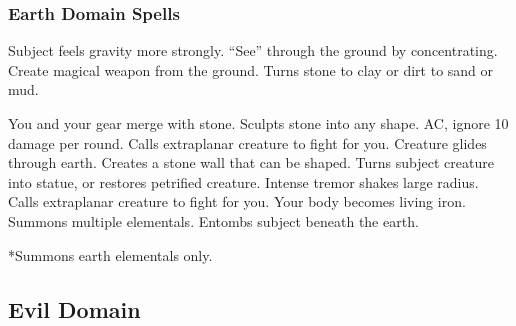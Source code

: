 \subsubsection{Earth Domain Spells}
\begin{spelllist}
   Subject feels gravity more strongly.
   ``See'' through the ground by concentrating.
   Create magical weapon from the ground.
   Turns stone to clay or dirt to sand or mud.
  
   You and your gear merge with stone.
   Sculpts stone into any shape.
    AC, ignore 10 damage per round.
   Calls extraplanar creature to fight for you.
   Creature glides through earth. 
   Creates a stone wall that can be shaped.
  \spellhead[6]{}
   Turns subject creature into statue, or restores petrified creature.
   Intense tremor shakes large radius.
   Calls extraplanar creature to fight for you.
   Your body becomes living iron.
  \spellhead[8]{}
   Summons multiple elementals.
   Entombs subject beneath the earth.
\end{spelllist}
*Summons earth elementals only.

\subsection{Evil Domain}

